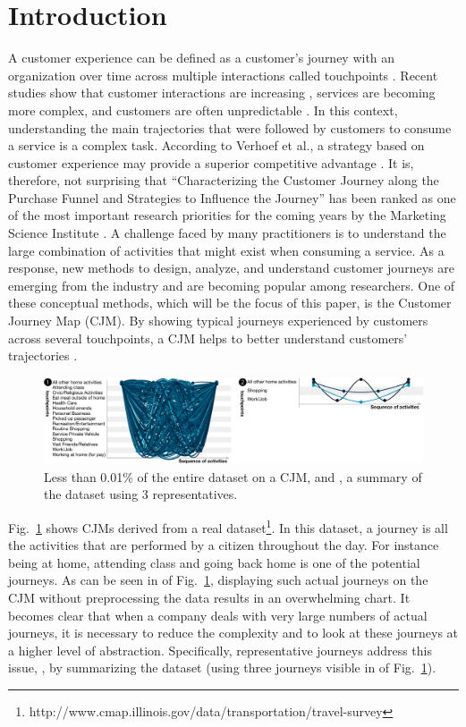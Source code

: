 \documentclass[runningheads]{llncs}
\begin{document}
\section{Introduction}
A customer experience can be defined as a customer's journey with an organization over time across multiple interactions called touchpoints \cite{lemon2016understanding}. Recent studies show that customer interactions are increasing \cite{how_to_improve}, services are becoming more complex, and customers are often unpredictable \cite{key_factors_in}. In this context, understanding the main trajectories that were followed by customers to consume a service is a complex task. According to Verhoef et al., a strategy based on customer experience may provide a superior competitive advantage \cite{lemon2016understanding}. It is, therefore, not surprising that ``Characterizing the Customer Journey along the Purchase Funnel and Strategies to Influence the Journey'' has been ranked as one of the most important research priorities for the coming years by the Marketing Science Institute  \cite{MSI2016}. A challenge faced by many practitioners is to understand the large combination of activities that might exist when consuming a service. As a response, new methods to design, analyze, and understand customer journeys are emerging from the industry and are becoming popular among researchers. One of these conceptual methods, which will be the focus of this paper, is the Customer Journey Map (CJM). By showing typical journeys experienced by customers across several touchpoints, a CJM helps to better understand customers' trajectories \cite{bernard2017cjm}. 

\begin{figure}[H]
\centering
\includegraphics[width=1\columnwidth]{05_schema/intro2.pdf}
\caption{ Less than 0.01\% of the entire dataset on a CJM, and , a  summary of the dataset using 3 representatives.}
\label{representativejourney}
\end{figure}

Fig.~\ref{representativejourney} shows CJMs derived from a real dataset\footnote{http://www.cmap.illinois.gov/data/transportation/travel-survey
}. In this dataset, a journey is all the activities that are performed by a citizen throughout the day. For instance being at home, attending class and going back home is one of the potential journeys. As can be seen in  of Fig.~{\ref{representativejourney}}, displaying such actual journeys on the CJM without preprocessing the data results in an overwhelming chart. It becomes clear that when a company deals with very large numbers of actual journeys, it is necessary to reduce the complexity and to look at these journeys at a higher level of abstraction. Specifically, representative journeys address this issue, \cite{bernard2019genetic}, by summarizing the dataset (using three journeys visible in  of Fig.~\ref{representativejourney}). 
\end{document}
